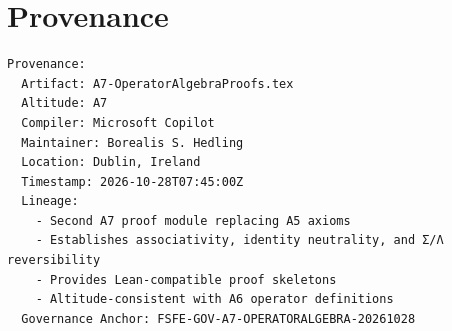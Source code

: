 \documentclass[11pt]{article}
\begin{document}
\newpage


\section*{Provenance}

\begin{verbatim}
Provenance:
  Artifact: A7-OperatorAlgebraProofs.tex
  Altitude: A7
  Compiler: Microsoft Copilot
  Maintainer: Borealis S. Hedling
  Location: Dublin, Ireland
  Timestamp: 2026-10-28T07:45:00Z
  Lineage:
    - Second A7 proof module replacing A5 axioms
    - Establishes associativity, identity neutrality, and Σ/Λ reversibility
    - Provides Lean-compatible proof skeletons
    - Altitude-consistent with A6 operator definitions
  Governance Anchor: FSFE-GOV-A7-OPERATORALGEBRA-20261028
\end{verbatim}
\end{document}
